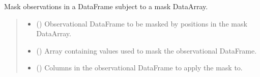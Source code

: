 \documentclass[letterpaper,10pt,english]{sphinxmanual}
\begin{document}
\begin{fulllineitems}
\label{\detokenize{misc:glomar_gridding.mask.mask_observations}}
\pysigstartsignatures
\pysiglinewithargsret
{}
{\sphinxparamcomma {}\sphinxparamcomma {}\sphinxparamcomma {}\sphinxparamcomma {}\sphinxparamcomma {}\sphinxparamcomma {}\sphinxparamcomma {}\sphinxparamcomma {}\sphinxparamcomma {}\sphinxparamcomma {}}
{}
\pysigstopsignatures
\sphinxAtStartPar
Mask observations in a DataFrame subject to a mask DataArray.
\begin{quote}\begin{description}
\begin{itemize}
\item {}
\sphinxAtStartPar
{} () \textendash{} Observational DataFrame to be masked by positions in the mask
DataArray.

\item {}
\sphinxAtStartPar
{} () \textendash{} Array containing values used to mask the observational DataFrame.

\item {}
\sphinxAtStartPar
{} (\sphinxstyleliteralemphasis{\sphinxupquote{ | }}\sphinxstyleliteralemphasis{\sphinxupquote{{[}}}\sphinxstyleliteralemphasis{\sphinxupquote{{]}}}) \textendash{} Columns in the observational DataFrame to apply the mask to.


\end{itemize}
\end{description}
\end{quote}
\end{fulllineitems}
\end{document}
